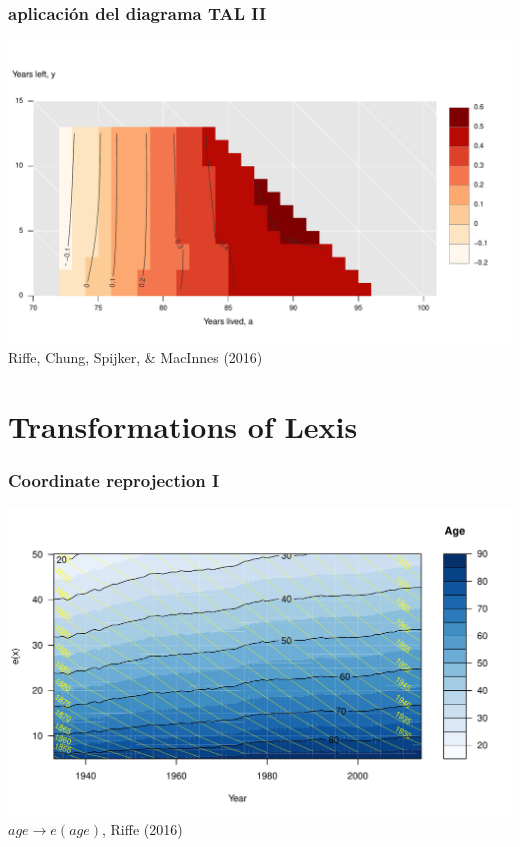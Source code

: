 \documentclass[20pt]{beamer}
\begin{document}
\begin{frame}
\frametitle{aplicaci\'{o}n del diagrama TAL II}
\hspace{2cm}\includegraphics[scale=.9]{Figures/TAL_male_back.pdf}\\
Riffe, Chung, Spijker, \& MacInnes (2016)
\end{frame}

\section{Transformations of Lexis}

\begin{frame}
\frametitle{Coordinate reprojection I}
\includegraphics[scale=1]{Figures/ProspAgeLexis.pdf}\\
$age \rightarrow e(age)$, Riffe (2016)
\end{frame}
\end{document}
